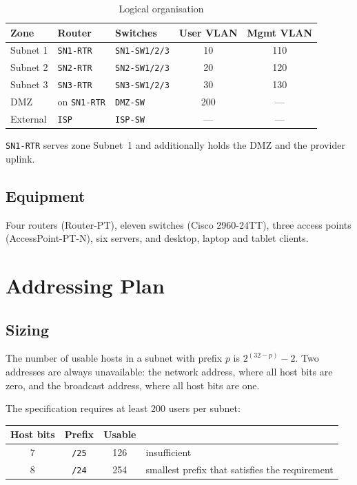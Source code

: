 \documentclass[12pt,a4paper]{article}
\begin{document}
\begin{table}[H]
\centering
\caption{Logical organisation}
\begin{tabular}{@{} l l l c c @{}}
\toprule
\textbf{Zone} & \textbf{Router} & \textbf{Switches} & \textbf{User VLAN} & \textbf{Mgmt VLAN} \\
\midrule
Subnet 1 & \texttt{SN1-RTR} & \texttt{SN1-SW1/2/3} & 10 & 110 \\
Subnet 2 & \texttt{SN2-RTR} & \texttt{SN2-SW1/2/3} & 20 & 120 \\
Subnet 3 & \texttt{SN3-RTR} & \texttt{SN3-SW1/2/3} & 30 & 130 \\
DMZ      & on \texttt{SN1-RTR} & \texttt{DMZ-SW}   & 200 & --- \\
External & \texttt{ISP}     & \texttt{ISP-SW}      & --- & --- \\
\bottomrule
\end{tabular}
\end{table}

\texttt{SN1-RTR} serves zone Subnet~1 and additionally holds the DMZ and the
provider uplink.

\subsection{Equipment}

Four routers (Router-PT), eleven switches (Cisco 2960-24TT), three access points
(AccessPoint-PT-N), six servers, and desktop, laptop and tablet clients.


\newpage
\section{Addressing Plan}

\subsection{Sizing}

The number of usable hosts in a subnet with prefix $p$ is $2^{(32-p)} - 2$. Two
addresses are always unavailable: the network address, where all host bits are
zero, and the broadcast address, where all host bits are one.

The specification requires at least 200 users per subnet:

\begin{center}
\begin{tabular}{@{} c c c l @{}}
\toprule
\textbf{Host bits} & \textbf{Prefix} & \textbf{Usable} & \\
\midrule
7 & \texttt{/25} & 126 & insufficient \\
8 & \texttt{/24} & 254 & smallest prefix that satisfies the requirement \\
\bottomrule
\end{tabular}
\end{center}
\end{document}
